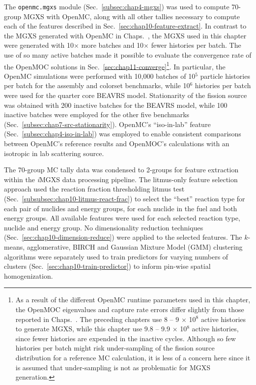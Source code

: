 The \texttt{openmc.mgxs} module (Sec.~\ref{subsec:chap4-mgxs}) was used to compute 70-group \ac{MGXS} with OpenMC, along with all other tallies necessary to compute each of the features described in Sec.~\ref{sec:chap10-feature-extract}. In contrast to the \ac{MGXS} generated with OpenMC in Chaps.~, the \ac{MGXS} used in this chapter were generated with 10$\times$ more batches and 10$\times$ fewer histories per batch. The use of so many active batches made it possible to evaluate the convergence rate of the OpenMOC solutions in Sec.~\ref{sec:chap11-converge}\footnote{As a result of the different OpenMC runtime parameters used in this chapter, the OpenMOC eigenvalues and capture rate errors differ slightly from those reported in Chaps.~. The preceding chapters use 8 -- 9 $\times$ 10$^{8}$ active histories to generate \ac{MGXS}, while this chapter use 9.8 -- 9.9 $\times$ 10$^{8}$ active histories, since fewer histories are expended in the inactive cycles. Although so few histories per batch might risk under-sampling of the fission source distribution for a reference \ac{MC} calculation, it is less of a concern here since it is assumed that under-sampling is not as problematic for \ac{MGXS} generation.}. In particular, the OpenMC simulations were performed with 10,000 batches of 10$^{5}$ particle histories per batch for the assembly and colorset benchmarks, while 10$^{6}$ histories per batch were used for the quarter core \ac{BEAVRS} model. Stationarity of the fission source was obtained with 200 inactive batches for the \ac{BEAVRS} model, while 100 inactive batches were employed for the other five benchmarks (Sec.~\ref{subsec:chap7-src-stationarity}). OpenMC's ``iso-in-lab'' feature (Sec.~\ref{subsec:chap4-iso-in-lab}) was employed to enable consistent comparisons between OpenMC's reference results and OpenMOC's calculations with an isotropic in lab scattering source.


The 70-group \ac{MC} tally data was condensed to 2-groups for feature extraction within the \textit{i}\ac{MGXS} data processing pipeline. The litmus-only feature selection approach used the reaction fraction thresholding litmus test (Sec.~\ref{subsubsec:chap10-litmus-react-frac}) to select the ``best'' reaction type for each pair of nuclides and energy groups, for each nuclide in the fuel and both energy groups. All available features were used for each selected reaction type, nuclide and energy group. No dimensionality reduction techniques (Sec.~\ref{sec:chap10-dimension-reduce}) were applied to the selected features. The $k$-means, agglomerative, BIRCH and Gaussian Mixture Model (GMM) clustering algorithms were separately used to train predictors for varying numbers of clusters (Sec.~\ref{sec:chap10-train-predictor}) to inform pin-wise spatial homogenization.

